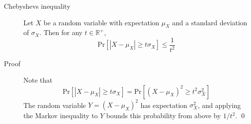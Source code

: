 \begin{description}
\item[Chebyshevs inequality] Let $X$ be a random variable with expectation
  $\mu_X$ and a standard deviation of $\sigma_X$. Then for any $t \in
  \mathbb{R}^+$,
  \[
    \text{Pr}[|X - \mu_X| \geq t\sigma_X] \leq \frac{1}{t^2}
  \]
\item[Proof] Note that
  \[
    \text{Pr}[|X - \mu_X| \geq t\sigma_X] = \text{Pr}[(X - \mu_X)^2 \geq
    t^2\sigma_X^2]
  \]
  The random variable $Y = (X - \mu_X)^2$ has expectation $\sigma_X^2$, and
  applying the Markov inequality to $Y$ bounds this probability from above by
  $1/t^2$. \qed
\end{description}
